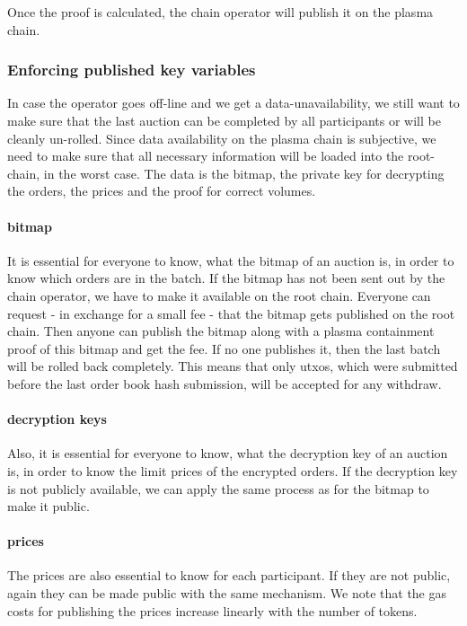 \documentclass[11pt,parskip=full]{scrartcl}%
\begin{document}
Once the proof is calculated, the chain operator will publish it on the plasma chain.


\subsubsection{Enforcing published key variables}

\label{enforceAvailablity}
In case the operator goes off-line and we get a data-unavailability, we still want to make sure that the last auction can be completed by all participants or will be cleanly un-rolled.
Since data availability on the plasma chain is subjective, we need to make sure that all necessary information will be loaded into the root-chain, in the worst case.
The data is the bitmap, the private key for decrypting the orders, the prices and the proof for correct volumes.

\paragraph{bitmap}
It is essential for everyone to know, what the bitmap of an auction is, in order to know which orders are in the batch.
If the bitmap has not been sent out by the chain operator, we have to make it available on the root chain.
Everyone can request - in exchange for a small fee - that the bitmap gets published on the root chain.
Then anyone can publish the bitmap along with a plasma containment proof of this bitmap and get the fee.
If no one publishes it, then the last batch will be rolled back completely.
This means that only utxos, which were submitted before the last order book hash submission, will be accepted for any withdraw.

\paragraph{decryption keys}
Also, it is essential for everyone to know, what the decryption key of an auction is, in order to know the limit prices of the encrypted orders.
If the decryption key is not publicly available, we can apply the same process as for the bitmap to make it public.

\paragraph{prices}
The prices are also essential to know for each participant.
If they are not public, again they can be made public with the same mechanism.
We note that the gas costs for publishing the prices increase linearly with the number of tokens.
\end{document}
